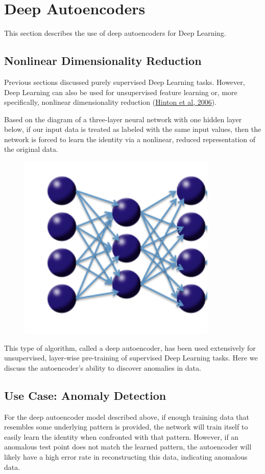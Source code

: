 {{\newpage
\section{Deep Autoencoders}
\label{sec:DeepAutoencoders}  
This section describes the use of deep autoencoders for Deep Learning. 
\subsection{Nonlinear Dimensionality Reduction} 
Previous sections discussed purely supervised Deep Learning tasks. However, Deep Learning can also be used for unsupervised feature learning or, more specifically, nonlinear dimensionality reduction  (\href{http://www.cs.toronto.edu/~hinton/science.pdf}{Hinton et al, 2006}). 

Based on the diagram of a three-layer neural network with one hidden layer below, if our input data is treated as labeled with the same input values, then the network is forced to learn the identity via a nonlinear, reduced representation of the original data. 

\begin{figure}[h!]
\centering
\includegraphics[scale=0.6]{autoencoder.png}
\end{figure}

This type of algorithm, called a deep autoencoder, has been used extensively for unsupervised, layer-wise pre-training of supervised Deep Learning tasks. Here we discuss the autoencoder's ability to discover anomalies in data. 



\subsection{Use Case: Anomaly Detection} %
For the deep autoencoder model described above, if enough training data that resembles some underlying pattern is provided, the network will train itself to easily learn the identity when confronted with that pattern. However, if an anomalous test point does not match the learned pattern, the autoencoder will likely have a high error rate in reconstructing this data, indicating anomalous data.

}}

